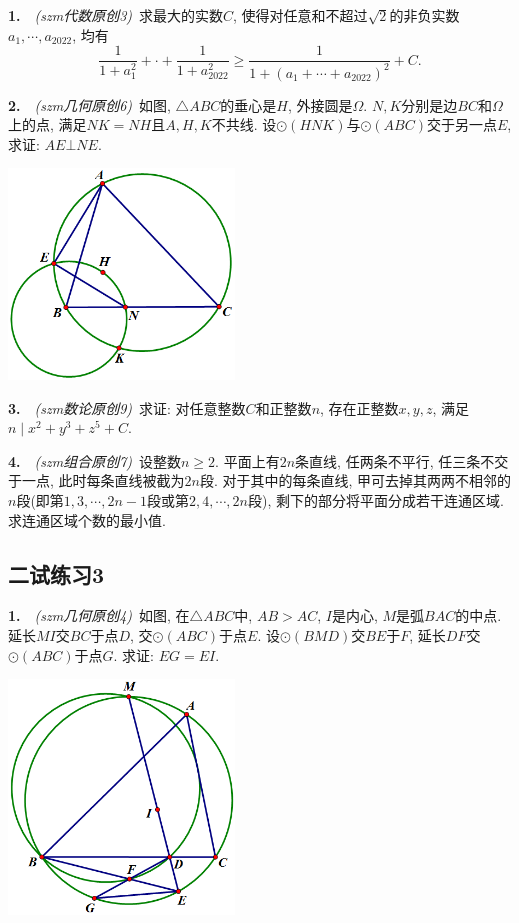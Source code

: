 \textbf{1.}~~\textit{(szm代数原创3)}~求最大的实数$C$, 使得对任意和不超过$\sqrt{2}$的非负实数$a_1,\cdots ,a_{2022}$, 均有$$\frac{1}{1+a_1^2} + \cdot + \frac{1}{1+a_{2022}^2} \geq \frac{1}{1+(a_1+\cdots +a_{2022})^2}+C.$$
\vspace{22em}

\textbf{2.}~~\textit{(szm几何原创6)}~如图, $\triangle ABC$的垂心是$H$, 外接圆是$\Omega$. $N,K$分别是边$BC$和$\Omega$上的点, 满足$NK=NH$且$A,H,K$不共线. 设$\odot (HNK)$与$\odot (ABC)$交于另一点$E$, 求证: $AE \bot NE$. 

\vspace{2em}
\includegraphics[width=6cm]{attachment/g6.png}

\newpage

\textbf{3.}~~\textit{(szm数论原创9)}~求证: 对任意整数$C$和正整数$n$, 存在正整数$x,y,z$, 满足$n \mid x^2+y^3+z^5+C$. 

\vspace{26em}

\textbf{4.}~~\textit{(szm组合原创7)}~设整数$n \geq 2$. 平面上有$2n$条直线, 任两条不平行, 任三条不交于一点, 此时每条直线被截为$2n$段. 对于其中的每条直线, 甲可去掉其两两不相邻的$n$段(即第$1,3,\cdots ,2n-1$段或第$2,4,\cdots ,2n$段), 剩下的部分将平面分成若干连通区域. 求连通区域个数的最小值. 

\newpage
\subsection*{二试练习3}

\textbf{1.}~~\textit{(szm几何原创4)}~如图, 在$\triangle ABC$中, $AB>AC$, $I$是内心, $M$是弧$BAC$的中点. 延长$MI$交$BC$于点$D$, 交$\odot (ABC)$于点$E$. 设$\odot (BMD)$交$BE$于$F$, 延长$DF$交$\odot (ABC)$于点$G$. 求证: $EG=EI$. 

\vspace{2em}
\includegraphics[width=6cm]{attachment/g4.png}

